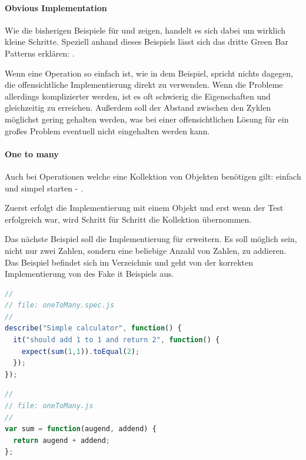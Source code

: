 \paragraph{Obvious Implementation}

Wie die bisherigen Beispiele für  und  zeigen, handelt es sich dabei um wirklich kleine Schritte. Speziell anhand dieses Beispiels lässt sich das dritte Green Bar Patterns erklären: .

Wenn eine Operation so einfach ist, wie in dem Beispiel, spricht nichts dagegen, die offensichtliche Implementierung direkt zu verwenden.
Wenn die Probleme allerdings komplizierter werden, ist es oft schwierig die Eigenschaften  und  gleichzeitig zu erreichen. Außerdem soll der Abstand zwischen den Zyklen möglichst gering gehalten werden, was bei einer offensichtlichen Lösung für ein großes Problem eventuell nicht eingehalten werden kann.

\paragraph{One to many}

Auch bei Operationen welche eine Kollektion von Objekten benötigen gilt: einfach und simpel starten -  \autocite[154]{Beck:2003}.

Zuerst erfolgt die Implementierung mit einem Objekt und erst wenn der Test erfolgreich war, wird Schritt für Schritt die Kollektion übernommen.

Das nächste Beispiel soll die Implementierung für  erweitern. Es soll möglich sein, nicht nur zwei Zahlen, sondern eine beliebige Anzahl von Zahlen, zu addieren. Das Beispiel befindet sich im Verzeichnis  und geht von der korrekten Implementierung von  des Fake it Beispiels aus.

\begin{lstlisting}[language=JavaScript]
//
// file: oneToMany.spec.js
//
describe("Simple calculator", function() {
  it("should add 1 to 1 and return 2", function() {
    expect(sum(1,1)).toEqual(2);
  });
});
\end{lstlisting}
\begin{lstlisting}[language=JavaScript]
//
// file: oneToMany.js
//
var sum = function(augend, addend) {
  return augend + addend;
};
\end{lstlisting}

